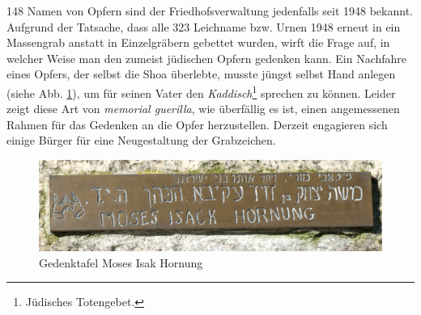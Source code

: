 148 Namen von Opfern sind der Friedhofsverwaltung jedenfalls seit 1948 bekannt. Aufgrund der Tatsache, dass alle 323 Leichname bzw. Urnen 1948 erneut in ein Massengrab anstatt in Einzelgräbern gebettet wurden, wirft die Frage auf, in welcher Weise man den zumeist jüdischen Opfern gedenken kann. Ein Nachfahre eines Opfers, der selbst die Shoa überlebte, musste jüngst selbst Hand anlegen (siehe Abb. \ref{MosesIsak}), um für seinen Vater den \emph{Kaddisch}\footnote{Jüdisches Totengebet.} sprechen zu können. Leider zeigt diese Art von \emph{memorial guerilla}, wie überfällig es ist, einen angemessenen Rahmen für das Gedenken an die Opfer herzustellen. Derzeit engagieren sich einige Bürger für eine Neugestaltung der Grabzeichen.

\begin{figure}[htb]
    \centering
    \includegraphics[width=\linewidth]{images/nk_hornung}
    \caption{Gedenktafel Moses Isak Hornung}
    \label{MosesIsak}
\end{figure}

\vspace{10pt} %

